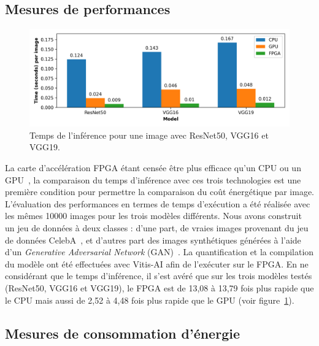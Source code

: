 \subsection{Mesures de performances}

\begin{figure}[!ht]
    \centering
    \includegraphics[width=\columnwidth]{4_Chapitre4/figures/characterization/time_of_inference_1_image.png}
    \caption{Temps de l'inférence pour une image avec ResNet50, VGG16 et VGG19.}
    \label{figure:herofake-time-inference}
\end{figure}

La carte d'accélération FPGA étant censée être plus efficace qu'un CPU ou un GPU~\cite{5272532}, la comparaison du temps d'inférence avec ces trois technologies est une première condition pour permettre la comparaison du coût énergétique par image. L'évaluation des performances en termes de temps d'exécution a été réalisée avec les mêmes 10000 images pour les trois modèles différents. Nous avons construit un jeu de données à deux classes : d'une part, de vraies images provenant du jeu de données CelebA~\cite{https://doi.org/10.48550/arxiv.1411.7766}, et d'autres part des images synthétiques générées à l'aide d'un \textit{Generative Adversarial Network} (GAN)~\cite{jimaging7080128}. La quantification et la compilation du modèle ont été effectuées avec Vitis-AI afin de l'exécuter sur le FPGA. En ne considérant que le temps d'inférence, il s'est avéré que sur les trois modèles testés (ResNet50, VGG16 et VGG19), le FPGA est de 13,08 à 13,79 fois plus rapide que le CPU mais aussi de 2,52 à 4,48 fois plus rapide que le GPU (voir figure~\ref{figure:herofake-time-inference}).

\subsection{Mesures de consommation d'énergie}

